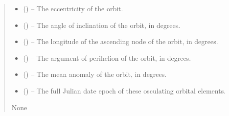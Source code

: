 \documentclass[letterpaper,11pt,english]{sphinxmanual}
\begin{document}
\begin{savenotes}
\begin{fulllineitems}
\begin{savenotes}
\begin{fulllineitems}
\begin{quote}
\begin{description}
\begin{itemize}
\item {} 
\sphinxAtStartPar
{} () – The eccentricity of the orbit.

\item {} 
\sphinxAtStartPar
{} () – The angle of inclination of the orbit, in degrees.

\item {} 
\sphinxAtStartPar
{} () – The longitude of the ascending node of the orbit, in degrees.

\item {} 
\sphinxAtStartPar
{} () – The argument of perihelion of the orbit, in degrees.

\item {} 
\sphinxAtStartPar
{} () – The mean anomaly of the orbit, in degrees.

\item {} 
\sphinxAtStartPar
{} () – The full Julian date epoch of these osculating orbital elements.

\end{itemize}

\sphinxAtStartPar
None

\end{description}\end{quote}

\end{fulllineitems}\end{savenotes}



\end{fulllineitems}
\end{savenotes}
\end{document}
